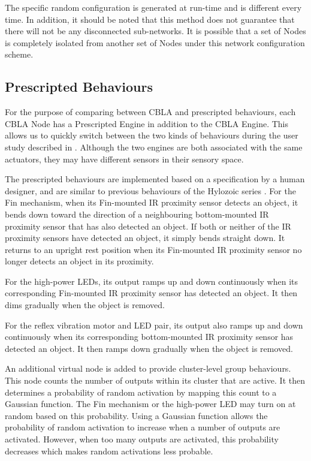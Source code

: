 The specific random configuration is generated at run-time and is different every time. In addition, it should be noted that this method does not guarantee that there will not be any disconnected sub-networks. It is possible that a set of Nodes is completely isolated from another set of Nodes under this network configuration scheme.

\subsection{Prescripted Behaviours}\label{sec:prescripted-behaviours}

For the purpose of comparing between CBLA and prescripted behaviours, each CBLA Node has a Prescripted Engine in addition to the CBLA Engine. This allows us to quickly switch between the two kinds of behaviours during the user study described in . Although the two engines are both associated with the same actuators, they may have different sensors in their sensory space. 

The prescripted behaviours are implemented based on a specification by a human designer, and are similar to previous behaviours of the Hylozoic series \cite{Gorbet2015}. For the Fin mechanism, when its Fin-mounted IR proximity sensor detects an object, it bends down toward the direction of a neighbouring bottom-mounted IR proximity sensor that has also detected an object. If both or neither of the IR proximity sensors have detected an object, it simply bends straight down. It returns to an upright rest position when its Fin-mounted IR proximity sensor no longer detects an object in its proximity.

For the high-power LEDs, its output ramps up and down continuously when its corresponding Fin-mounted IR proximity sensor has detected an object. It then dims gradually when the object is removed.

For the reflex vibration motor and LED pair, its output also ramps up and down continuously when its corresponding bottom-mounted IR proximity sensor has detected an object. It then ramps down gradually when the object is removed.

An additional virtual node is added to provide cluster-level group behaviours. This node counts the number of outputs within its cluster that are active. It then determines a probability of random activation by mapping this count to a Gaussian function. The Fin mechanism or the high-power LED may turn on at random based on this probability. Using a Gaussian function allows the probability of random activation to increase when a number of outputs are activated. However, when too many outputs are activated, this probability decreases which makes random activations less probable. 

